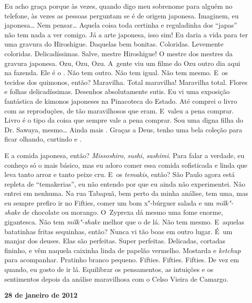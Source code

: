 Eu acho graça porque às vezes, quando digo meu sobrenome para alguém no
telefone, às vezes as pessoas perguntam se é de origem japonesa.
Imaginem, eu japonesa… Nem pensar… Aquela coisa toda
certinha e reguladinha dos ``japas'' não tem nada a ver comigo. Já a
arte japonesa, isso sim! Eu daria a vida para ter uma gravura do
Hiroshigue. Daquelas bem bonitas. Coloridas. Levemente coloridas.
Delicadíssimas. Salve, mestre Hiroshigue! O mestre dos mestres da
gravura japonesa. Ozu, Ozu, Ozu. A~gente viu um filme do Ozu outro dia
aqui na fazenda. Ele é o   . Não tem outro. Não tem
igual. Não tem mesmo. E~os tecidos dos quimonos, então?
Maravilha. Total maravilha! Maravilha total. Flores e folhas
delicadíssimas. Desenhos absolutamente sutis. Eu vi uma exposição
fantástica de kimonos japoneses na Pinacoteca do Estado. Até comprei o
livro com as reproduções, de tão maravilhosos que eram. E~valeu a pena
comprar. Livro é o tipo da coisa que sempre vale a pena comprar. Sou uma
digna filha do Dr. Sawaya, mesmo… Ainda mais   .
Graças a Deus, tenho uma bela coleção para ficar olhando, curtindo e
.

E a comida japonesa, então? \emph{Missoshiro}, \emph{sushi},
\emph{sashimi}. Para falar a verdade, eu conheço só o mais básico, mas
eu adoro comer essa comida sofisticada e linda que leva tanto arroz e
tanto peixe cru. E~os \emph{temakis}, então? São Paulo agora está
repleta de ``temakerias'', eu não entendo por que eu ainda não
experimentei. Não entrei em nenhuma. Na rua Tabapuã, bem perto da minha
análise, tem uma, mas eu sempre prefiro ir no Fifties, comer um bom
x"-búrguer salada e um \emph{milk"-shake} de chocolate ou morango. O~Zyprexa dá mesmo uma fome enorme, gigantesca. Não tem \emph{milk"-shake}
melhor que o de lá. Não tem mesmo. E~aquelas batatinhas fritas
sequinhas, então? Nunca vi tão boas em outro lugar. É~um manjar dos
deuses. Elas são perfeitas. Super perfeitas. Delicadas, cortadas
fininho, e vêm naquela caixinha linda de papelão vermelho. Mostarda e
\emph{ketchup} para acompanhar. Pratinho branco pequeno. Fifties.
Fifties. Fifties. De vez em quando, eu gosto de ir lá. Equilibrar os
pensamentos, as intuições e os sentimentos depois da análise maravilhosa
com o Celso Vieira de Camargo.

\begin{center}\asterisc{}\end{center}


\begin{flushright}\textbf{28 de janeiro de 2012}\end{flushright}


